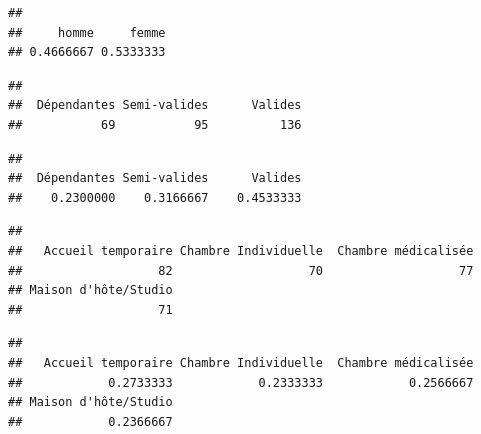 \documentclass[
]{article}
\newenvironment{Shaded}{\begin{snugshade}}{\end{snugshade}}
\newcommand{\CommentTok}[1]{\textcolor[rgb]{0.56,0.35,0.01}{\textit{#1}}}
\newcommand{\FunctionTok}[1]{\textcolor[rgb]{0.13,0.29,0.53}{\textbf{#1}}}
\newcommand{\NormalTok}[1]{#1}
\newcommand{\SpecialCharTok}[1]{\textcolor[rgb]{0.81,0.36,0.00}{\textbf{#1}}}
\begin{document}
\begin{verbatim}
## 
##     homme     femme 
## 0.4666667 0.5333333
\end{verbatim}

\begin{Shaded}
\end{Shaded}

\begin{verbatim}
## 
##  Dépendantes Semi-valides      Valides 
##           69           95          136
\end{verbatim}

\begin{Shaded}
\end{Shaded}

\begin{verbatim}
## 
##  Dépendantes Semi-valides      Valides 
##    0.2300000    0.3166667    0.4533333
\end{verbatim}

\begin{Shaded}
\end{Shaded}

\begin{verbatim}
## 
##   Accueil temporaire Chambre Individuelle  Chambre médicalisée 
##                   82                   70                   77 
## Maison d'hôte/Studio 
##                   71
\end{verbatim}

\begin{Shaded}
\end{Shaded}

\begin{verbatim}
## 
##   Accueil temporaire Chambre Individuelle  Chambre médicalisée 
##            0.2733333            0.2333333            0.2566667 
## Maison d'hôte/Studio 
##            0.2366667
\end{verbatim}
\end{document}
